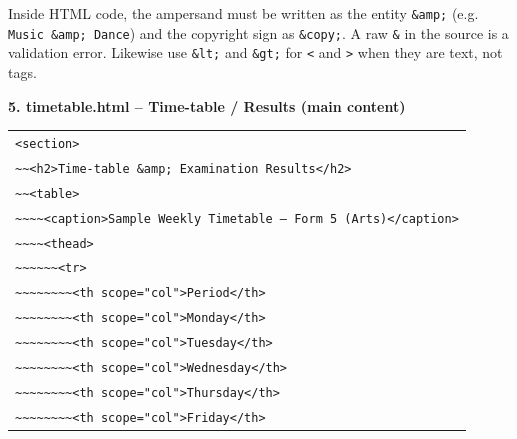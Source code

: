 \documentclass[11pt]{article}
\begin{document}
\begin{attention}
Inside HTML code, the ampersand must be written as the entity \texttt{\&amp;} (e.g. \texttt{Music \&amp; Dance}) and the copyright sign as \texttt{\&copy;}. A raw \texttt{\&} in the source is a validation error. Likewise use \texttt{\&lt;} and \texttt{\&gt;} for \texttt{<} and \texttt{>} when they are text, not tags.
\end{attention}

\textbf{5. timetable.html -- Time-table / Results (main content)}
\begin{center}
\begin{tabular}{l}
\texttt{<section>} \\
\texttt{\textasciitilde{}\textasciitilde{}<h2>Time-table \&amp; Examination Results</h2>} \\
\texttt{\textasciitilde{}\textasciitilde{}<table>} \\
\texttt{\textasciitilde{}\textasciitilde{}\textasciitilde{}\textasciitilde{}<caption>Sample Weekly Timetable -- Form 5 (Arts)</caption>} \\
\texttt{\textasciitilde{}\textasciitilde{}\textasciitilde{}\textasciitilde{}<thead>} \\
\texttt{\textasciitilde{}\textasciitilde{}\textasciitilde{}\textasciitilde{}\textasciitilde{}\textasciitilde{}<tr>} \\
\texttt{\textasciitilde{}\textasciitilde{}\textasciitilde{}\textasciitilde{}\textasciitilde{}\textasciitilde{}\textasciitilde{}\textasciitilde{}<th scope="col">Period</th>} \\
\texttt{\textasciitilde{}\textasciitilde{}\textasciitilde{}\textasciitilde{}\textasciitilde{}\textasciitilde{}\textasciitilde{}\textasciitilde{}<th scope="col">Monday</th>} \\
\texttt{\textasciitilde{}\textasciitilde{}\textasciitilde{}\textasciitilde{}\textasciitilde{}\textasciitilde{}\textasciitilde{}\textasciitilde{}<th scope="col">Tuesday</th>} \\
\texttt{\textasciitilde{}\textasciitilde{}\textasciitilde{}\textasciitilde{}\textasciitilde{}\textasciitilde{}\textasciitilde{}\textasciitilde{}<th scope="col">Wednesday</th>} \\
\texttt{\textasciitilde{}\textasciitilde{}\textasciitilde{}\textasciitilde{}\textasciitilde{}\textasciitilde{}\textasciitilde{}\textasciitilde{}<th scope="col">Thursday</th>} \\
\texttt{\textasciitilde{}\textasciitilde{}\textasciitilde{}\textasciitilde{}\textasciitilde{}\textasciitilde{}\textasciitilde{}\textasciitilde{}<th scope="col">Friday</th>} \\

\end{tabular}
\end{center}
\end{document}
